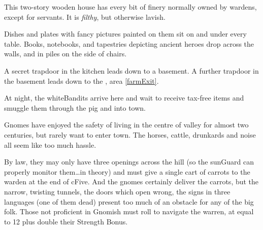 \begin{multicols}{2}

This two-story wooden house has every bit of finery normally owned by \glspl{warden}, except for servants.
It is \emph{filthy}, but otherwise lavish.

\begin{boxtext}
  Dishes and plates with fancy pictures painted on them sit on and under every table.
  Books, notebooks, and tapestries depicting ancient heroes drop across the walls, and in piles on the side of chairs.
\end{boxtext}

A secret trapdoor in the kitchen leads down to a basement.
A further trapdoor in the basement leads down to the , area \vref{farmExit}.

At night, the \gls{whiteBandits} arrive here and wait to receive tax-free items and smuggle them through the \gls{pig} and into \gls{town}.



Gnomes have enjoyed the safety of living in the centre of \gls{valley} for almost two centuries, but rarely want to enter \gls{town}.
The horses, cattle, drunkards and noise all seem like too much hassle.

By law, they may only have three openings across the hill (so the \gls{sunGuard} can properly monitor them\ldots in theory) and must give a single cart of carrots to the \gls{warden} at the end of \gls{cFive}.
And the gnomes certainly deliver the carrots, but the narrow, twisting tunnels, the doors which open wrong, the signs in three languages (one of them dead) present too much of an obstacle for any of the big folk.
Those not proficient in Gnomish must roll  to navigate the warren, at  equal to 12 plus double their Strength Bonus.



\end{multicols}
